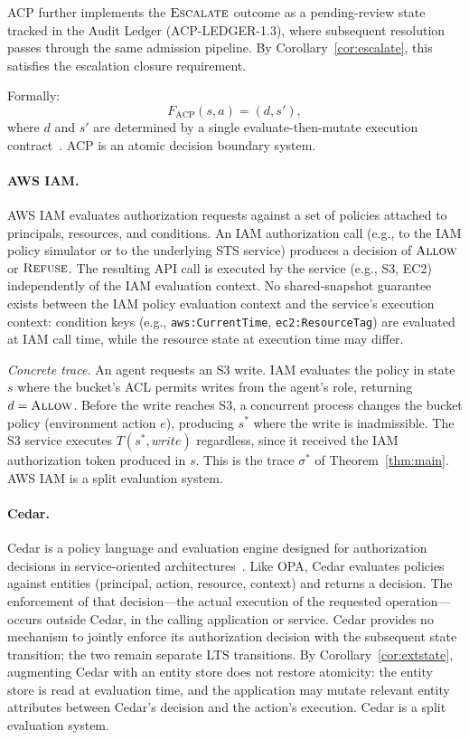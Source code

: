\documentclass[11pt]{article}
\theoremstyle{plain}
\theoremstyle{definition}
\theoremstyle{remark}
\newcommand{\Allow}{\textsc{Allow}}
\newcommand{\Refuse}{\textsc{Refuse}}
\newcommand{\Escalate}{\textsc{Escalate}}
\begin{document}
ACP further implements the $\Escalate$ outcome as a pending-review state
tracked in the Audit Ledger (ACP-LEDGER-1.3), where subsequent resolution
passes through the same admission pipeline.  By Corollary~\ref{cor:escalate},
this satisfies the escalation closure requirement.

Formally:
\[
  F_{\mathrm{ACP}}(s, a) = (d, s'),
\]
where $d$ and $s'$ are determined by a single evaluate-then-mutate execution
contract~\cite{acp26}.  ACP is an atomic decision boundary system.

\paragraph{AWS IAM.}
AWS IAM evaluates authorization requests against a set of policies attached
to principals, resources, and conditions.  An IAM authorization call
(e.g., to the IAM policy simulator or to the underlying STS service)
produces a decision of $\Allow$ or $\Refuse$.  The resulting API call is
executed by the service (e.g., S3, EC2) independently of the IAM evaluation
context.  No shared-snapshot guarantee exists between the IAM policy
evaluation context and the service's execution context: condition keys
(e.g., \texttt{aws:CurrentTime}, \texttt{ec2:ResourceTag}) are evaluated
at IAM call time, while the resource state at execution time may differ.

\emph{Concrete trace.}  An agent requests an S3 write.  IAM evaluates the
policy in state $s$ where the bucket's ACL permits writes from the agent's
role, returning $d = \Allow$.  Before the write reaches S3, a concurrent
process changes the bucket policy (environment action $e$), producing $s^*$
where the write is inadmissible.  The S3 service executes $T(s^*, \mathit{write})$
regardless, since it received the IAM authorization token produced in $s$.
This is the trace $\sigma^*$ of Theorem~\ref{thm:main}.  AWS IAM is a split
evaluation system.

\paragraph{Cedar.}
Cedar is a policy language and evaluation engine designed for authorization
decisions in service-oriented architectures~\cite{cedar}.  Like OPA, Cedar
evaluates policies against entities (principal, action, resource, context)
and returns a decision.  The enforcement of that decision---the actual
execution of the requested operation---occurs outside Cedar, in the calling
application or service.  Cedar provides no mechanism to jointly enforce
its authorization decision with the subsequent state transition; the two
remain separate LTS transitions.  By Corollary~\ref{cor:extstate},
augmenting Cedar with an entity store does not restore atomicity: the
entity store is read at evaluation time, and the application may mutate
relevant entity attributes between Cedar's decision and the action's execution.
Cedar is a split evaluation system.
\end{document}
